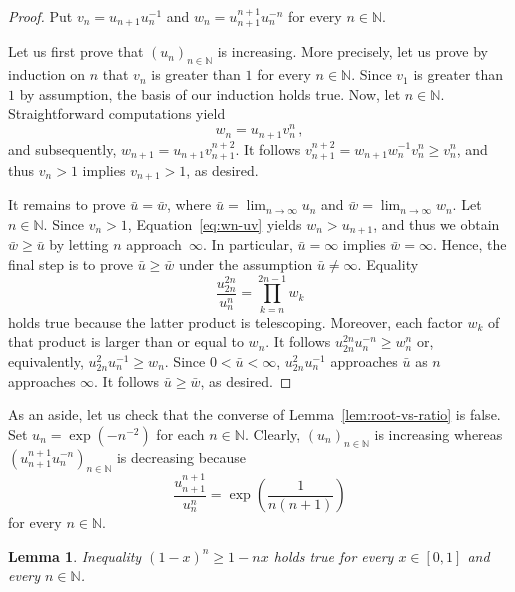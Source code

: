 \documentclass[12pt,a4paper]{article}
\newcommand{\bN}{\mathbb{N}}
\newtheorem{lemma}{Lemma}
\begin{document}
\begin{proof}
 Put
  $v_n = u_{n + 1} u_n^{-1}$
  and
  $w_n = u_{n + 1}^{n + 1} u_n^{- n}$
  for every $n \in \bN$.
  
  Let us first prove that $\left( u_n \right)_{n \in \bN}$ is increasing.
  More precisely, let us prove by induction on $n$ that $v_n$ is greater than $1$ for every $n \in \bN$.
  Since $v_1$ is greater than $1$ by assumption,
  the basis of our induction holds true.
  Now, let $n \in \bN$. %
  Straightforward computations yield
  \begin{equation} \label{eq:wn-uv}
    w_n = u_{n + 1}v_n^n \,, 
  \end{equation} 
  and subsequently, 
  $w_{n + 1} = u_{n + 1} v_{n + 1}^{n + 2}$.
  It follows  
  $v_{n + 1}^{n + 2}= w_{n + 1}w_n^{-1} v_n^n \ge v_n^n$,
  and thus $v_n > 1$ implies $v_{n + 1} > 1$, as desired.

  It remains to prove $\bar u = \bar w$, where 
  $\bar u = \lim_{n \to \infty} u_n$ and 
  $\bar w = \lim_{n \to \infty} w_n$.
  Let $n \in \bN$.
  Since $v_n > 1$,
  Equation~\eqref{eq:wn-uv} yields $w_n > u_{n + 1}$,
  and thus we obtain $\bar w \ge \bar u$ by letting $n$ approach~$\infty$.
  In particular, $\bar u = \infty$ implies $\bar w = \infty$.
  Hence, the final step is to prove $\bar u \ge \bar w$ under the assumption $\bar u \ne \infty$.
  Equality 
  $$
  \frac{u_{2n}^{2n}}{ u_n^n} =  \prod_{k = n}^{2n - 1} w_k
  $$
  holds true because the latter product is telescoping.
  Moreover, each factor $w_k$ of that product is larger than or equal to $w_n$.
  It follows 
  $u_{2n}^{2n} u_n^{-n} \ge w_n^n$ 
  or, equivalently,
  $u_{2n}^2u_n^{- 1}  \ge  w_n$.
  Since $0 < \bar u < \infty$, 
  $u_{2n}^2 u_n^{-1}$ approaches $\bar u$ as $n$ approaches $\infty$.
  It follows $\bar u \ge \bar w$, as desired.
\end{proof}

As an aside, let us check that the converse of Lemma~\ref{lem:root-vs-ratio} is false.
Set $ u_n = \exp \left( - n^{- 2} \right)$ for each $n \in \bN$.
Clearly,  $\left( u_n \right)_{n \in \bN}$  is increasing whereas
$\left(  u_{n + 1}^{n + 1}  u_n^{-n} \right)_{n \in \bN}$ is decreasing because 
$$
\frac{u_{n + 1}^{n + 1}}{u_n^n} = \exp \left(\frac{1}{n (n + 1)} \right) 
$$
for every $n \in \bN$.

\begin{lemma} \label{lem:Bernoulli}
   Inequality ${(1 - x)}^n \ge  1 - n x$ 
   holds true for every $x \in [0, 1]$ and every $n \in \bN$.
\end{lemma} 
\end{document}
